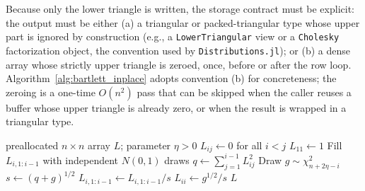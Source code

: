 \documentclass[12pt,english]{article}
\theoremstyle{plain} %
\theoremstyle{definition} %
\theoremstyle{remark} %
\begin{document}
Because only the lower triangle is written, the storage contract must be explicit: the output must be either (a) a triangular or packed-triangular type whose upper part is ignored by construction (e.g., a \texttt{LowerTriangular} view or a \texttt{Cholesky} factorization object, the convention used by \texttt{Distributions.jl}); or (b) a dense array whose strictly upper triangle is zeroed, once, before or after the row loop. Algorithm~\ref{alg:bartlett_inplace} adopts convention (b) for concreteness; the zeroing is a one-time $O(n^2)$ pass that can be skipped when the caller reuses a buffer whose upper triangle is already zero, or when the result is wrapped in a triangular type.

\begin{algorithm}[H]
\caption{In-place normalized-Bartlett $\operatorname{LKJ}_n(\eta)$ Cholesky sampler}
\label{alg:bartlett_inplace}
\begin{algorithmic}[1]
\Require preallocated $n\times n$ array $L$; parameter $\eta>0$
\State $L_{ij}\gets0$ for all $i<j$ 
\State $L_{11}\gets1$
  \State Fill $L_{i,1:i-1}$ with independent $N(0,1)$ draws 
  \State $q\gets\sum_{j=1}^{i-1}L_{ij}^2$ 
  \State Draw $g\sim\chi^2_{n+2\eta-i}$
  \State $s\gets(q+g)^{1/2}$
  \State $L_{i,1:i-1}\gets L_{i,1:i-1}/s$ 
  \State $L_{ii}\gets g^{1/2}/s$
\EndFor
\State \Return $L$ 
\end{algorithmic}
\end{algorithm}
\end{document}
